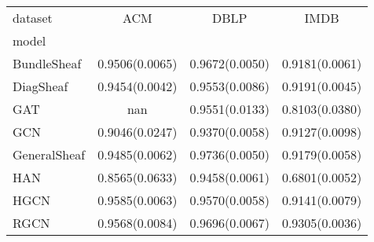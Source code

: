 \begin{tabular}{lSSS}
\toprule
{dataset} & {ACM} & {DBLP} & {IMDB} \\
{model} & {} & {} & {} \\
\midrule
BundleSheaf & 0.9506(0.0065) & 0.9672(0.0050) & 0.9181(0.0061) \\
DiagSheaf & 0.9454(0.0042) & 0.9553(0.0086) & 0.9191(0.0045) \\
GAT & nan & 0.9551(0.0133) & 0.8103(0.0380) \\
GCN & 0.9046(0.0247) & 0.9370(0.0058) & 0.9127(0.0098) \\
GeneralSheaf & 0.9485(0.0062) & 0.9736(0.0050) & 0.9179(0.0058) \\
HAN & 0.8565(0.0633) & 0.9458(0.0061) & 0.6801(0.0052) \\
HGCN & 0.9585(0.0063) & 0.9570(0.0058) & 0.9141(0.0079) \\
RGCN & 0.9568(0.0084) & 0.9696(0.0067) & 0.9305(0.0036) \\
\bottomrule
\end{tabular}
